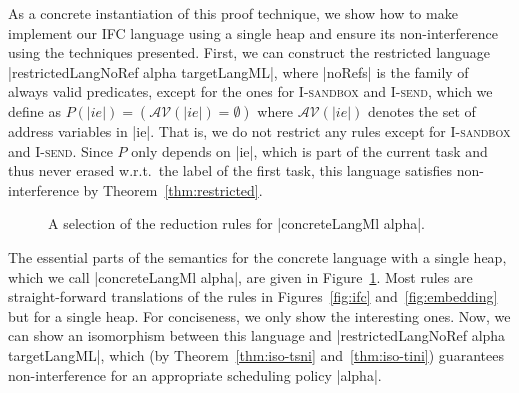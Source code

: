 As a concrete instantiation of this proof technique, we show
how to make implement our IFC language using a single heap and
ensure its non-interference using the techniques presented.
First, we can construct the restricted language
|restrictedLangNoRef alpha targetLangML|, where |noRefs| is
the family of always valid predicates, except for the ones for
\textsc{I-sandbox} and \textsc{I-send}, which we define as
$ P(|ie|) = (\mathcal{AV}(|ie|) = \emptyset{}) $
where $\mathcal{AV}(|ie|)$ denotes the set of address variables in |ie|.
That is, we do not restrict any rules except for \textsc{I-sandbox}
and \textsc{I-send}.
Since $P$ only depends on |ie|, which is part of the current
task and thus never erased w.r.t.\ the label of the first task,
this language satisfies non-interference by Theorem~\ref{thm:restricted}.

\begin{figure}
  
  
  \caption{A selection of the reduction rules for |concreteLangMl alpha|.}
  \label{fig:concrete}
\end{figure}

The essential parts of the semantics for the concrete language
with a single heap,
which we call |concreteLangMl alpha|,
are given in Figure~\ref{fig:concrete}.  Most rules are
straight-forward translations of the rules in Figures~\ref{fig:ifc}
and~\ref{fig:embedding} but for a single heap.  For conciseness, we
only show the interesting ones.
Now, we can show an isomorphism between this language and
|restrictedLangNoRef alpha targetLangML|, which
(by Theorem~\ref{thm:iso-tsni} and~\ref{thm:iso-tini}) guarantees
non-interference for an appropriate scheduling policy |alpha|.

